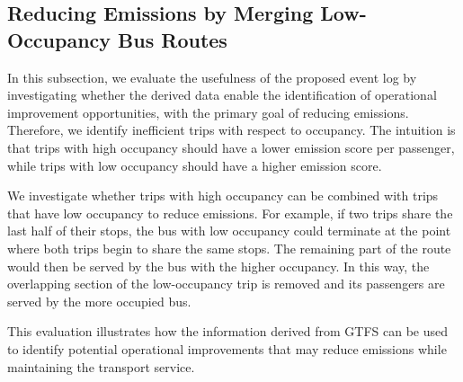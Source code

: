 \subsection{Reducing Emissions by Merging Low-Occupancy Bus Routes}
In this subsection, we evaluate the usefulness of the proposed event log by investigating whether the derived data enable the identification of operational improvement opportunities, with the primary goal of reducing emissions. Therefore, we identify inefficient trips with respect to occupancy. The intuition is that trips with high occupancy should have a lower emission score per passenger, while trips with low occupancy should have a higher emission score.

We investigate whether trips with high occupancy can be combined with trips that have low occupancy to reduce emissions. For example, if two trips share the last half of their stops, the bus with low occupancy could terminate at the point where both trips begin to share the same stops. The remaining part of the route would then be served by the bus with the higher occupancy. In this way, the overlapping section of the low-occupancy trip is removed and its passengers are served by the more occupied bus.

This evaluation illustrates how the information derived from GTFS can be used to identify potential operational improvements that may reduce emissions while maintaining the transport service.

